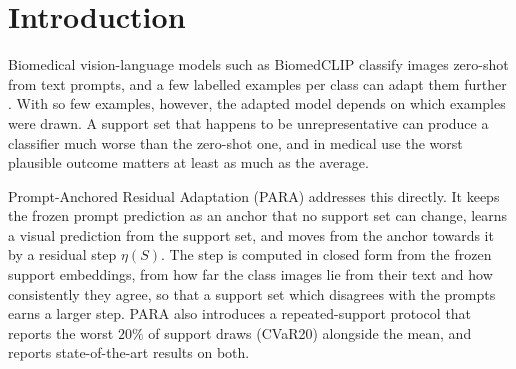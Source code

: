 \section{Introduction}\label{sec:intro}

Biomedical vision-language models such as BiomedCLIP \citep{zhang2023biomedclip} classify images zero-shot from text prompts,
and a few labelled examples per class can adapt them further \citep{koleilat2025biomedcoop}.
With so few examples, however, the adapted model depends on which examples were drawn.
A support set that happens to be unrepresentative can produce a classifier much worse than the zero-shot one,
and in medical use the worst plausible outcome matters at least as much as the average.

Prompt-Anchored Residual Adaptation (PARA) \citep{kang2026para} addresses this directly.
It keeps the frozen prompt prediction as an anchor that no support set can change,
learns a visual prediction from the support set, and moves from the anchor towards it by a residual step $\eta(S)$.
The step is computed in closed form from the frozen support embeddings, from how far the class images lie from their text and how consistently they agree,
so that a support set which disagrees with the prompts earns a larger step.
PARA also introduces a repeated-support protocol that reports the worst $20\%$ of support draws (CVaR20) alongside the mean,
and reports state-of-the-art results on both.

